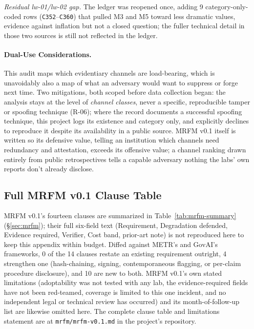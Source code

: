 \documentclass[10pt]{article}
\begin{document}
\textit{Residual lw-01/lw-02 gap.} The ledger was reopened once, adding 9
category-only-coded rows (\texttt{C352}--\texttt{C360}) that pulled M3 and
M5 toward less dramatic values, evidence against inflation but not a closed
question; the fuller technical detail in those two sources is still not
reflected in the ledger.

\paragraph{Dual-Use Considerations.}
This audit maps which evidentiary channels are load-bearing, which is
unavoidably also a map of what an adversary would want to suppress or
forge next time. Two mitigations, both scoped before data collection began:
the analysis stays at the level of \emph{channel classes}, never a
specific, reproducible tamper or spoofing technique (R-06); where the
record documents a successful spoofing technique, this project logs its
existence and category only, and explicitly declines to reproduce it
despite its availability in a public source. MRFM v0.1 itself is written so
its defensive value, telling an institution which channels need
redundancy and attestation, exceeds its offensive value; a channel ranking
drawn entirely from public retrospectives tells a capable adversary nothing
the labs' own reports don't already disclose.

\subsection*{Full MRFM v0.1 Clause Table}
\label{app:mrfm-table}

MRFM v0.1's fourteen clauses are summarized in Table~\ref{tab:mrfm-summary}
(\S\ref{sec:mrfm}); their full six-field text (Requirement, Degradation
defended, Evidence required, Verifier, Cost band, prior-art note) is not
reproduced here to keep this appendix within budget. Diffed against METR's
and GovAI's frameworks, 0 of the 14 clauses restate an existing requirement
outright, 4 strengthen one (hash-chaining, signing, contemporaneous
flagging, or per-claim procedure disclosure), and 10 are new to both.
MRFM v0.1's own stated limitations (adoptability was not tested with any
lab, the evidence-required fields have not been red-teamed, coverage is
limited to this one incident, and no independent legal or technical review
has occurred) and its month-of-follow-up list are likewise omitted here.
The complete clause table and limitations statement are at
\texttt{mrfm/mrfm-v0.1.md} in the project's repository.
\end{document}

